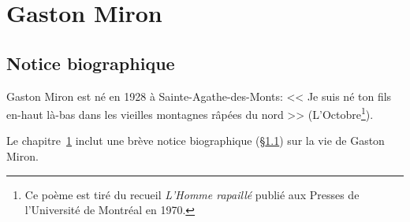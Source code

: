 \documentclass[french]{report}
\begin{document}
\chapter{Gaston Miron}
\label{s:miron}
\section{Notice biographique}
\label{s:biogr}
Gaston Miron est né en 1928 à Sainte-Agathe-des-Monts: << Je suis né ton fils en-haut là-bas dans les vieilles montagnes râpées du nord >> (L'Octobre\footnote{Ce poème est tiré du recueil \emph{L'Homme rapaillé} 
	publié aux Presses de l'Université de Montréal en 1970.}).

Le chapitre~\ref{s:miron} inclut une brève notice biographique (\S\ref{s:biogr}) sur la vie de Gaston Miron.
\end{document}
